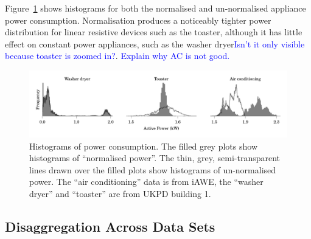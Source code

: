 \documentclass{sig-alternate}
\newcommand{\bluecolor}[1]{\textcolor{blue}{#1}}
\begin{document}
Figure~\ref{fig:power_histograms} shows
histograms for both the normalised and un-normalised appliance power
consumption. Normalisation produces a noticeably tighter power
distribution for linear resistive devices such as the toaster, although it has
little effect on constant power appliances, such as the washer dryer\bluecolor{Isn't it only visible because toaster is zoomed in?}.  \bluecolor{Explain why AC is not good.}
 
\begin{figure}[!t]
  \centering
  \includegraphics{figures/power_histograms.pdf} 
  \caption{Histograms of power consumption. The filled grey plots show
    histograms of ``normalised power''.  The thin, grey,
    semi-transparent lines drawn over the filled plots show histograms
    of un-normalised power.  The ``air conditioning'' data is from
    iAWE, the ``washer dryer'' and ``toaster'' are from UKPD building 1.}
  \label{fig:power_histograms} 
\end{figure}

\subsection{Disaggregation Across Data Sets}
\end{document}
